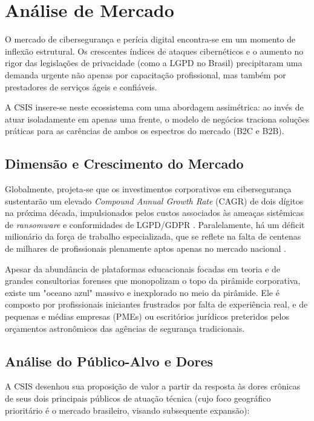 \documentclass[../main.tex]{subfiles}
\begin{document}
\section{Análise de Mercado}
O mercado de cibersegurança e perícia digital encontra-se em um momento de inflexão estrutural. Os crescentes índices de ataques cibernéticos e o aumento no rigor das legislações de privacidade (como a LGPD no Brasil) precipitaram uma demanda urgente não apenas por capacitação profissional, mas também por prestadores de serviços ágeis e confiáveis. 

A CSIS insere-se neste ecossistema com uma abordagem assimétrica: ao invés de atuar isoladamente em apenas uma frente, o modelo de negócios traciona soluções práticas para as carências de ambos os espectros do mercado (B2C e B2B).

\subsection{Dimensão e Crescimento do Mercado}

Globalmente, projeta-se que os investimentos corporativos em cibersegurança sustentarão um elevado \textit{Compound Annual Growth Rate} (CAGR) de dois dígitos na próxima década, impulsionados pelos custos associados às ameaças sistêmicas de \textit{ransomware} \citep{ransomware_trends} e conformidades de LGPD/GDPR \citep{cyber_market_global}. Paralelamente, há um déficit milionário da força de trabalho especializada, que se reflete na falta de centenas de milhares de profissionais plenamente aptos apenas no mercado nacional \citep{cyber_skills_gap_br}.

Apesar da abundância de plataformas educacionais focadas em teoria e de grandes consultorias forenses que monopolizam o topo da pirâmide corporativa, existe um "oceano azul" massivo e inexplorado no meio da pirâmide. Ele é composto por profissionais iniciantes frustrados por falta de experiência real, e de pequenas e médias empresas (PMEs) ou escritórios jurídicos preteridos pelos orçamentos astronômicos das agências de segurança tradicionais.

\subsection{Análise do Público-Alvo e Dores}

A CSIS desenhou sua proposição de valor a partir da resposta às dores crônicas de seus dois principais públicos de atuação técnica (cujo foco geográfico prioritário é o mercado brasileiro, visando subsequente expansão):
\end{document}
